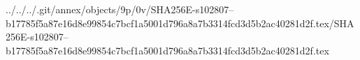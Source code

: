 ../../../.git/annex/objects/9p/0v/SHA256E-s102807--b17785f5a87e16d8e99854c7bcf1a5001d796a8a7b3314fcd3d5b2ac40281d2f.tex/SHA256E-s102807--b17785f5a87e16d8e99854c7bcf1a5001d796a8a7b3314fcd3d5b2ac40281d2f.tex